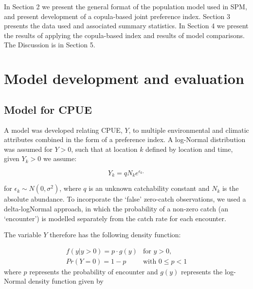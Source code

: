 \documentclass[review]{elsarticle}
\begin{document}
In Section 2 we present the general format of the population model used in SPM, and present development of a copula-based joint preference index. Section 3 presents the data used and associated summary statistics.  In Section 4 we present the results of applying the copula-based index and results of model comparisons.  The Discussion is in Section 5. 
	
	
			

\section{Model development and evaluation}

\subsection{Model for CPUE}
A model was developed relating CPUE, $Y$, to multiple environmental and climatic attributes combined in the form of a preference index.  A log-Normal distribution was assumed for $Y>0$, such that at location $k$ defined by location and time, given $Y_k >0$ we assume:

$$Y_k = qN_ke^{\epsilon_k,}$$ 

for $\epsilon_k \sim N(0, \sigma^2)$, where $q$ is an unknown catchability constant and $N_k$ is the absolute abundance.  To incorporate the `false' zero-catch observations, we used a delta-logNormal \citep{lo1992, martin2005} approach, in which the probability of a non-zero catch (an `encounter') is modelled separately from the catch rate for each encounter.   



The variable $Y$ therefore has the following density function:

$$\begin{array}{ll}
f(y|y>0) = p \cdot g(y) & \text{for } y>0, \\
Pr(Y=0) = 1-p & \text{with } 0 \le p < 1
\end{array}
$$
where $p$ represents the probability of encounter and $g(y)$ represents the log-Normal density function given by
\end{document}
